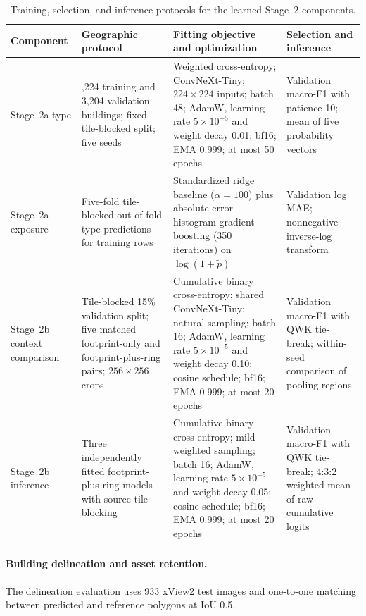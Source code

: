 \begin{table}[t]
\centering
\caption{Training, selection, and inference protocols for the learned Stage~2 components.}
\label{tab:training_protocols}
\scriptsize
\setlength{\tabcolsep}{3pt}
\begin{tabularx}{\textwidth}{>{\raggedright\arraybackslash}p{2.2cm}>{\raggedright\arraybackslash}p{3.7cm}>{\raggedright\arraybackslash}p{5.1cm}>{\raggedright\arraybackslash}X}
\toprule
Component & Geographic protocol & Fitting objective and optimization & Selection and inference \\
\midrule
Stage~2a type & 18,224 training and 3,204 validation buildings; fixed tile-blocked split; five seeds & Weighted cross-entropy; ConvNeXt-Tiny; $224\times224$ inputs; batch 48; AdamW, learning rate $5\times10^{-5}$ and weight decay 0.01; bf16; EMA 0.999; at most 50 epochs & Validation macro-F1 with patience 10; mean of five probability vectors \\
Stage~2a exposure & Five-fold tile-blocked out-of-fold type predictions for training rows & Standardized ridge baseline ($\alpha=100$) plus absolute-error histogram gradient boosting (350 iterations) on $\log(1+\widetilde p)$ & Validation log MAE; nonnegative inverse-log transform \\
Stage~2b context comparison & Tile-blocked 15\% validation split; five matched footprint-only and footprint-plus-ring pairs; $256\times256$ crops & Cumulative binary cross-entropy; shared ConvNeXt-Tiny; natural sampling; batch 16; AdamW, learning rate $5\times10^{-5}$ and weight decay 0.10; cosine schedule; bf16; EMA 0.999; at most 20 epochs & Validation macro-F1 with QWK tie-break; within-seed comparison of pooling regions \\
Stage~2b inference & Three independently fitted footprint-plus-ring models with source-tile blocking & Cumulative binary cross-entropy; mild weighted sampling; batch 16; AdamW, learning rate $5\times10^{-5}$ and weight decay 0.05; cosine schedule; bf16; EMA 0.999; at most 20 epochs & Validation macro-F1 with QWK tie-break; 4:3:2 weighted mean of raw cumulative logits \\
\bottomrule
\end{tabularx}
\end{table}

\paragraph{Building delineation and asset retention.}
The delineation evaluation uses 933 xView2 test images and one-to-one matching between predicted and reference polygons at IoU 0.5.

